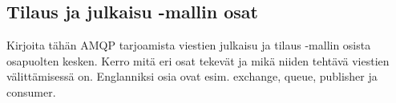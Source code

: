 \subsection{Tilaus ja julkaisu -mallin osat}
\begin{it}
	Kirjoita tähän AMQP tarjoamista viestien julkaisu ja tilaus -mallin osista osapuolten kesken. Kerro mitä eri osat tekevät ja mikä niiden tehtävä viestien välittämisessä on. Englanniksi osia ovat esim. exchange, queue, publisher ja consumer.
\end{it}